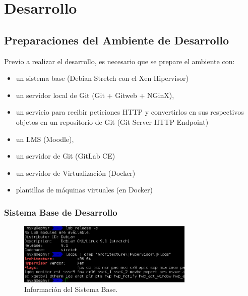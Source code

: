 
\chapter{Desarrollo}
\label{capitulo4}

        
\section{Preparaciones del Ambiente de Desarrollo}
Previo a realizar el desarrollo, es necesario que se prepare el ambiente con:
\begin{itemize}
  \item un sistema base (Debian Stretch con el Xen Hipervisor)
  \item un servidor local de Git (Git + Gitweb + NGinX),
  \item un servicio para recibir peticiones HTTP y convertirlos en sus respectivos objetos en un repositorio de Git (Git Server HTTP Endpoint)
  \item un LMS  (Moodle),
  \item un servidor de Git (GitLab CE)
  \item un servidor de Virtualización (Docker)
  \item plantillas de máquinas virtuales (en Docker)
\end{itemize}

\subsection{Sistema Base de Desarrollo}

\begin{figure}
	\begin{center}
    	\includegraphics[width=0.75\textwidth]{Figures/sistema-base.png}
    \end{center}
  	\caption{Información del Sistema Base.}
    \label{sistema-base}
\end{figure}

